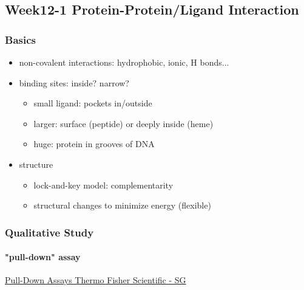 \documentclass[]{article}
\let\oldparagraph\paragraph
\renewcommand{\paragraph}[1]{\oldparagraph{#1}\mbox{}}
\begin{document}
\hypertarget{week12-1-protein-proteinligand-interaction}{%
\subsection{Week12-1 Protein-Protein/Ligand
Interaction}\label{week12-1-protein-proteinligand-interaction}}

\hypertarget{basics-2}{%
\subsubsection{Basics}\label{basics-2}}

\begin{itemize}
\item
  non-covalent interactions: hydrophobic, ionic, H bonds...
\item
  binding sites: inside? narrow?

  \begin{itemize}
  \item
    small ligand: pockets in/outside
  \item
    larger: surface (peptide) or deeply inside (heme)
  \item
    huge: protein in grooves of DNA
  \end{itemize}
\item
  structure

  \begin{itemize}
  \item
    lock-and-key model: complementarity
  \item
    structural changes to minimize energy (flexible)
  \end{itemize}
\end{itemize}

\hypertarget{qualitative-study}{%
\subsubsection{Qualitative Study}\label{qualitative-study}}

\hypertarget{pull-down-assay}{%
\paragraph{"pull-down" assay}\label{pull-down-assay}}

\href{https://www.thermofisher.com/sg/en/home/life-science/protein-biology/protein-biology-learning-center/protein-biology-resource-library/pierce-protein-methods/pull-down-assays.html}{Pull-Down
Assays \textbar{} Thermo Fisher Scientific - SG}
\end{document}
